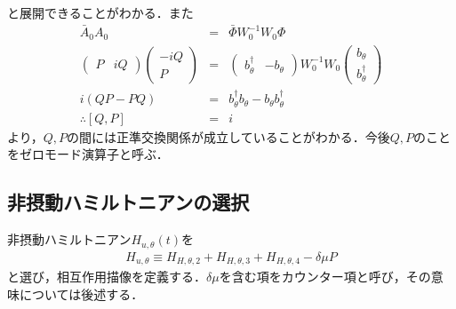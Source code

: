 \documentclass[10.5pt,a4paper]{jreport}
\begin{document}
と展開できることがわかる．また
\begin{eqnarray}
  \bar A_0 A_0 &=&\bar\Phi W^{-1}_0W_0\Phi\\
  \begin{pmatrix}
    P & iQ
  \end{pmatrix}
  \begin{pmatrix}
    -iQ \\
    P 
  \end{pmatrix}
  &=&
  \begin{pmatrix}
    b^\dagger_\theta & -b_\theta
  \end{pmatrix}
  W^{-1}_0W_0
  \begin{pmatrix}
    b_\theta \\
    b^\dagger_\theta 
  \end{pmatrix}\\
  i(Q P-P Q) &=& b^\dagger_\theta b_\theta - b_\theta b^\dagger_\theta\\
  \therefore [Q, P] &=& i
\end{eqnarray}
より，$Q,P$の間には正準交換関係が成立していることがわかる．今後$Q,P$のことをゼロモード演算子と呼ぶ．
\subsection{非摂動ハミルトニアンの選択}
非摂動ハミルトニアン$H_{u,\theta}(t)$を
\begin{eqnarray}
  H_{u,\theta} \equiv H_{H,\theta,2} + H_{H,\theta,3} + H_{H,\theta,4} -\delta\mu P
\end{eqnarray}
と選び，相互作用描像を定義する．$\delta \mu$を含む項をカウンター項と呼び，その意味については後述する．
\end{document}
